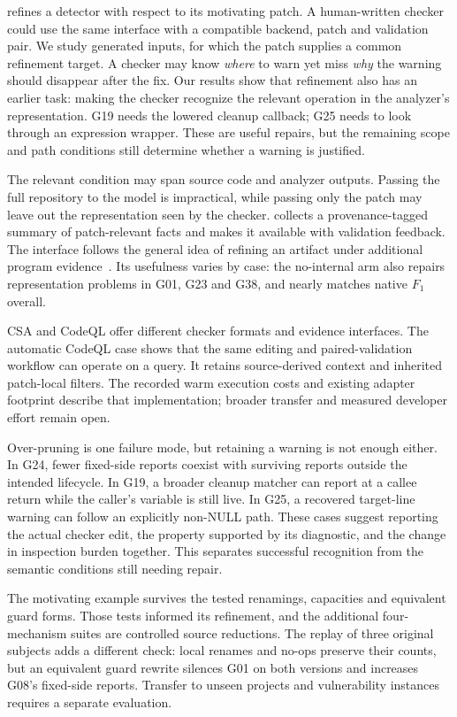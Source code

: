 \toolname refines a detector with respect to its motivating patch.
A human-written checker could use the same interface with a compatible backend, patch and validation pair.
We study generated inputs, for which the patch supplies a common refinement target.
A checker may know \emph{where} to warn yet miss \emph{why} the warning should disappear after the fix.
Our results show that refinement also has an earlier task: making the checker recognize the relevant operation in the analyzer's representation.
G19 needs the lowered cleanup callback; G25 needs to look through an expression wrapper.
These are useful repairs, but the remaining scope and path conditions still determine whether a warning is justified.

The relevant condition may span source code and analyzer outputs.
Passing the full repository to the model is impractical, while passing only the patch may leave out the representation seen by the checker.
\toolname collects a provenance-tagged summary of patch-relevant facts and makes it available with validation feedback.
The interface follows the general idea of refining an artifact under additional program evidence~\cite{clarke2000cegar,solarlezama2006sketch,nguyen2013semfix,mechtaev2016angelix,long2016prophet}.
Its usefulness varies by case: the no-internal arm also repairs representation problems in G01, G23 and G38, and nearly matches native $F_1$ overall.

CSA and CodeQL offer different checker formats and evidence interfaces.
The automatic CodeQL case shows that the same editing and paired-validation workflow can operate on a query.
It retains source-derived context and inherited patch-local filters.
The recorded warm execution costs and existing adapter footprint describe that implementation; broader transfer and measured developer effort remain open.

Over-pruning is one failure mode, but retaining a warning is not enough either.
In G24, fewer fixed-side reports coexist with surviving reports outside the intended lifecycle.
In G19, a broader cleanup matcher can report at a callee return while the caller's variable is still live.
In G25, a recovered target-line warning can follow an explicitly non-NULL path.
These cases suggest reporting the actual checker edit, the property supported by its diagnostic, and the change in inspection burden together.
This separates successful recognition from the semantic conditions still needing repair.

The motivating example survives the tested renamings, capacities and equivalent guard forms.
Those tests informed its refinement, and the additional four-mechanism suites are controlled source reductions.
The replay of three original subjects adds a different check: local renames and no-ops preserve their counts, but an equivalent guard rewrite silences G01 on both versions and increases G08's fixed-side reports.
Transfer to unseen projects and vulnerability instances requires a separate evaluation.
